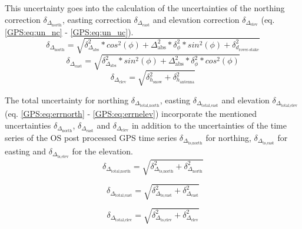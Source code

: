 This uncertainty goes into the calculation of the uncertainties of the northing correction $\delta_{\Delta_{\text{north}}}$, easting correction $\delta_{\Delta_{\text{east}}}$ and elevation correction $\delta_{\Delta_{\text{elev}}}$ (eq. \ref{GPS:eq:un_nc} - \ref{GPS:eq:un_uc}). 
\begin{equation} \label{GPS:eq:un_nc}
	\delta_{\Delta_{\text{north}}} = \sqrt{\delta_{\Delta_{\text{abs}}}^2 * cos^2(\phi) + \Delta_{\text{abs}}^2 * \delta_{\phi}^2 * sin^2(\phi) + \delta_{d_{\text{rover-stake}}}^2}
\end{equation}
\begin{equation} \label{GPS:eq:un_ec}
	\delta_{\Delta_{\text{east}}} = \sqrt{\delta_{\Delta_{\text{abs}}}^2 * sin^2(\phi) + \Delta_{\text{abs}}^2 * \delta_{\phi}^2 * cos^2(\phi)}
\end{equation}
\begin{equation} \label{GPS:eq:un_uc}
\delta_{\Delta_{\text{elev}}} = \sqrt{\delta_{h_{\text{snow}}}^2 + \delta_{h_{\text{antenna}}}^2}
\end{equation}
	
The total uncertainty for northing $\delta_{\Delta_{\text{total,north}}}$, easting $\delta_{\Delta_{\text{total,east}}}$ and elevation $\delta_{\Delta_{\text{total,elev}}}$ (eq. \ref{GPS:eq:errnorth} - \ref{GPS:eq:errnelev}) incorporate the mentioned uncertainties $\delta_{\Delta_{\text{north}}}$, $\delta_{\Delta_{\text{east}}}$ and $\delta_{\Delta_{\text{elev}}}$ in addition to the uncertainties of the time series of the OS post processed GPS time series $\delta_{\Delta_{\text{ts,north}}}$ for northing, $\delta_{\Delta_{\text{ts,east}}}$ for easting and $\delta_{\Delta_{\text{ts,elev}}}$ for the elevation.
\begin{equation}
	\delta_{\Delta_{\text{total,north}}} = \sqrt{\delta_{\Delta_{\text{ts,north}}}^2 + \delta_{\Delta_{\text{north}}}^2}
	\label{GPS:eq:errnorth}
\end{equation}

\begin{equation}
	\delta_{\Delta_{\text{total,east}}} = \sqrt{\delta_{\Delta_{\text{ts,east}}}^2 + \delta_{\Delta_{\text{east}}}^2}
	\label{GPS:eq:erreast}
\end{equation}

\begin{equation}
	\delta_{\Delta_{\text{total,elev}}} = \sqrt{\delta_{\Delta_{\text{ts,elev}}}^2 +\delta_{\Delta_{\text{elev}}}^2}
	\label{GPS:eq:errnelev}
\end{equation}

